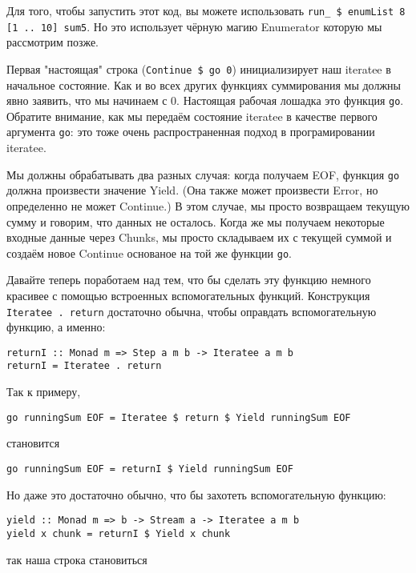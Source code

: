 Для того, чтобы запустить этот код, вы можете использовать \lstinline'run_ $ enumList 8 [1 .. 10] sum5'. Но это использует чёрную магию Enumerator которую мы рассмотрим позже.

Первая "настоящая" строка (\lstinline'Continue $ go 0') инициализирует наш iteratee в начальное состояние. Как и во всех других функциях суммирования мы должны явно заявить, что мы начинаем с 0. Настоящая рабочая лошадка это функция \lstinline'go'. Обратите внимание, как мы передаём состояние iteratee в качестве первого аргумента \lstinline'go': это тоже очень распространенная подход в програмировании iteratee.

Мы должны обрабатывать два разных случая: когда получаем EOF, функция \lstinline'go' должна произвести значение Yield. (Она также может произвести Error, но определенно не может Continue.) В этом случае, мы просто возвращаем текущую сумму и говорим, что данных не осталось. Когда же мы получаем некоторые входные данные через Chunks, мы просто складываем их с текущей суммой и создаём новое Continue основаное на той же функции \lstinline'go'.

Давайте теперь поработаем над тем, что бы сделать эту функцию немного красивее с помощью встроенных вспомогательных функций. Конструкция \lstinline'Iteratee . return' достаточно обычна, чтобы оправдать вспомогательную функцию, а именно:

\begin{lstlisting}
returnI :: Monad m => Step a m b -> Iteratee a m b
returnI = Iteratee . return
\end{lstlisting}

Так к примеру,

\begin{lstlisting}
go runningSum EOF = Iteratee $ return $ Yield runningSum EOF
\end{lstlisting}

становится

\begin{lstlisting}
go runningSum EOF = returnI $ Yield runningSum EOF
\end{lstlisting}

Но даже это достаточно обычно, что бы захотеть вспомогательную функцию:

\begin{lstlisting}
yield :: Monad m => b -> Stream a -> Iteratee a m b
yield x chunk = returnI $ Yield x chunk
\end{lstlisting}

так наша строка становиться

